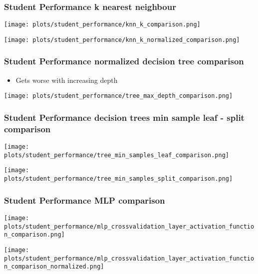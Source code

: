 \documentclass[aspectratio=169]{beamer}
\begin{document}
\begin{frame}{}
\frametitle{Student Performance k nearest neighbour}
\begin{minipage}{0.49\textwidth}
    \texttt{[image: plots/student\_performance/knn\_k\_comparison.png]}
\end{minipage}
\begin{minipage}{0.49\textwidth}
    \texttt{[image: plots/student\_performance/knn\_k\_normalized\_comparison.png]}
\end{minipage}
\end{frame}

\begin{frame}{}
\frametitle{Student Performance normalized decision tree comparison}
\begin{minipage}{0.3\textwidth}
\begin{itemize}
\item  Gets worse with increasing depth
\end{itemize}
\end{minipage}
\begin{minipage}{0.69\textwidth}
    \texttt{[image: plots/student\_performance/tree\_max\_depth\_comparison.png]}
\end{minipage}
\end{frame}

\begin{frame}{}
\frametitle{Student Performance decision trees min sample leaf - split  comparison}
\begin{minipage}{0.49\textwidth}
    \texttt{[image: plots/student\_performance/tree\_min\_samples\_leaf\_comparison.png]}
\end{minipage}
\begin{minipage}{0.49\textwidth}
    \texttt{[image: plots/student\_performance/tree\_min\_samples\_split\_comparison.png]}
\end{minipage}
\end{frame}

\begin{frame}{}
\frametitle{Student Performance MLP comparison}
\begin{minipage}{0.49\textwidth}
    \texttt{[image: plots/student\_performance/mlp\_crossvalidation\_layer\_activation\_function\_comparison.png]}
\end{minipage}
\begin{minipage}{0.49\textwidth}
    \texttt{[image: plots/student\_performance/mlp\_crossvalidation\_layer\_activation\_function\_comparison\_normalized.png]}
\end{minipage}
\end{frame}
\end{document}
